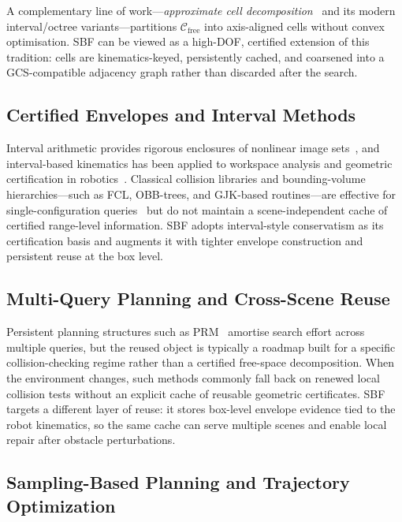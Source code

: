 \documentclass[journal]{IEEEtran}
\newcommand{\Cfree}{\mathcal{C}_{\mathrm{free}}}
\begin{document}
A complementary line of work—\emph{approximate cell
decomposition}~\cite{lozanoperez1983spatial,brooks1985subdivision}
and its modern interval/octree
variants—partitions $\Cfree$ into axis-aligned cells without convex
optimisation. SBF can be viewed as a high-DOF, certified extension of
this tradition: cells are kinematics-keyed, persistently cached, and
coarsened into a GCS-compatible adjacency graph rather than discarded
after the search.

\subsection{Certified Envelopes and Interval Methods}

Interval arithmetic provides rigorous enclosures of nonlinear image
sets~\cite{moore2009introduction,jaulin2001applied}, and interval-based
kinematics has been applied to workspace analysis and geometric
certification in robotics~\cite{merlet2004solving,merlet2006interval}.
Classical collision libraries and bounding-volume hierarchies---such as
FCL, OBB-trees, and GJK-based routines---are effective for
single-configuration queries~\cite{pan2012fcl,gottschalk1996obbtree,
gilbert1988fast} but do not maintain a scene-independent cache of
certified range-level information.
SBF adopts interval-style conservatism as its certification basis and
augments it with tighter envelope construction and persistent reuse at
the box level.

\subsection{Multi-Query Planning and Cross-Scene Reuse}

Persistent planning structures such as PRM~\cite{kavraki1996probabilistic}
amortise search effort across multiple queries, but the reused object
is typically a roadmap built for a specific collision-checking regime
rather than a certified free-space decomposition.
When the environment changes, such methods commonly fall back on
renewed local collision tests without an explicit cache of reusable
geometric certificates.
SBF targets a different layer of reuse: it stores box-level envelope
evidence tied to the robot kinematics, so the same cache can serve
multiple scenes and enable local repair after obstacle perturbations.

\subsection{Sampling-Based Planning and Trajectory Optimization}
\end{document}

